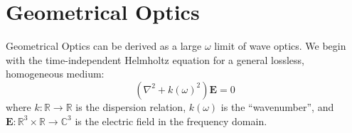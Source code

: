 \documentclass{article}
\begin{document}
\newcommand{\ampRep}{\vec{A}}
\newcommand{\ampCoef}{\ampRep_m}
\newcommand{\freq}{\omega}
\newcommand{\cPoynt}{\mathbf{S}}
\newcommand{\cond}{\sigma}
\newcommand{\curv}{\kappa}
\newcommand{\defeq}{\overset{\mathclap{\text{def}} }{=}}
\newcommand{\eFreq}{\mathbf{E}}
\newcommand{\eFreqMom}{\tilde{\eFreq}}
\newcommand{\eikonal}{\mathcal{L}}
\newcommand{\complexNums}{\mathbb{C}}
\newcommand{\dispRel}{k}
\newcommand{\eTime}{\mathscr{E}}
\newcommand{\eqBy}[1]{\overset{\mathclap{\eqref{#1} }}{=}}
\newcommand{\fourier}{\mathcal{F}}
\newcommand{\fresnel}{\Gamma}
\newcommand{\hFreq}{\mathbf{H}}
\newcommand{\hTime}{\mathscr{H}}
\newcommand{\im}{j}
\newcommand{\impedance}{\eta}
\newcommand{\incField}{\eFreq_i}
\newcommand{\initField}{\eFreq_0}
\newcommand{\laplacian}{\nabla^2}
\newcommand{\permeab}{\mu}
\newcommand{\permitt}{\epsilon}
\newcommand{\pos}{\vec{r}}
\newcommand{\posMag}{r}
\newcommand{\incPt}{\pos_i}
\newcommand{\focalPt}{\vec{f}_r}
\newcommand{\posNorm}{\hat{r}}
\newcommand{\incPtNorm}{\posNorm_i}
\newcommand{\poyntAvg}{\langle \poynt \rangle}
\newcommand{\normV}{\vec{n}}
\newcommand{\normVNorm}{\hat{n}}
\newcommand{\poynt}{\mathscr{S}}
\newcommand{\reals}{\mathbb{R}}
\newcommand{\surf}{\Sigma}
\newcommand{\posSurf}{\pos_{\surf}}
\newcommand{\tx}{\pos_t}
\newcommand{\txNorm}{\posNorm_t}
\newcommand{\wavenum}{\dispRel( \freq )}
\newcommand{\wavevec}{\mathbf{k}}
\newcommand{\wavevecNorm}{\hat{\wavevec}}
\newcommand{\reflNorm}{\wavevecNorm_r}
\newcommand{\reflPt}{\pos_r}
\newcommand{\txPower}{P_0}
\newcommand{\unitTang}{\hat{t}}
\newcommand{\unitNorm}{\hat{n}}
\newcommand{\kra}{\wavevec_i + 2 \dispRel \cos \theta_i \unitNorm(0)}
\newcommand{\krb}{(-2 \dispRel \curv_{\surf}(0) \cos \theta_i ) \unitTang(0) + (2
                  \dispRel \curv_{\surf}(0) \sin \theta _i ) \unitNorm(0) }
\newcommand{\krca}{\left( - 2 \dispRel \curv_{\surf}'(0) \cos \theta_i - 4 \dispRel
                   \curv_{\surf}^2(0) \sin \theta_i \right) \unitTang(0)}
\newcommand{\krcb}{\left( 2 \dispRel \curv_{\surf}'(0) \sin \theta_i  - 4 \dispRel
                   \curv_{\surf}^2(0) \cos \theta_i \right) \unitNorm(0)}
\section{Geometrical Optics}
Geometrical Optics can be derived as a large $\freq$ limit of wave optics. We begin
with the time-independent Helmholtz equation for a general lossless, homogeneous
medium: 
\begin{equation}
   ( \laplacian + \wavenum^2 ) \eFreq = 0
   \label{eq:helmholtz}
\end{equation}
where $\dispRel : \reals \to \reals$ is the dispersion relation, $\wavenum$
is the ``wavenumber'', and $\eFreq : \reals^{3} \times \reals \to \complexNums^3$ is
the electric field in the frequency domain.
\end{document}
